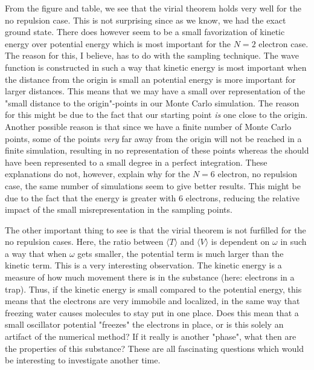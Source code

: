 From the figure and table, we see that the virial theorem holds very well for the no repulsion case. 
This is not surprising since as we know, we had the exact ground state. 
There does however seem to be a small favorization of kinetic energy over potential energy which is most important for the $N=2$ electron case. 
The reason for this, I believe, has to do with the sampling technique. 
The wave function is constructed in such a way that kinetic energy is most important when the distance from the origin is small an potential energy is more important for larger distances. 
This means that we may have a small over representation of the "small distance to the origin"-points in our Monte Carlo simulation. 
The reason for this might be due to the fact that our starting point \textit{is} one close to the origin. 
Another possible reason is that since we have a finite number of Monte Carlo points, some of the points \textit{very} far away from the origin will not be reached in a finite simulation, resulting in no representation of these points whereas the should have been represented to a small degree in a perfect integration. 
These explanations do not, however, explain why for the $N=6$ electron, no repulsion case, the same number of simulations seem to give better results. 
This might be due to the fact that the energy is greater with $6$ electrons, reducing the relative impact of the small misrepresentation in the sampling points. 

The other important thing to see is that the virial theorem is not furfilled for the no repulsion cases. 
Here, the ratio between $\langle T \rangle$ and $\langle V \rangle$ is dependent on $\omega$ in such a way that when $\omega$ gets smaller, the potential term is much larger than the kinetic term. 
This is a very interesting observation. 
The kinetic energy is a measure of how much movement there is in the substance (here: electrons in a trap). 
Thus, if the kinetic energy is small compared to the potential energy, this means that the electrons are very immobile and localized, in the same way that freezing water causes molecules to stay put in one place. 
Does this mean that a small oscillator potential "freezes" the electrons in place, or is this solely an artifact of the numerical method? 
If it really is another "phase", what then are the properties of this substance?
These are all fascinating questions which would be interesting to investigate another time. 
